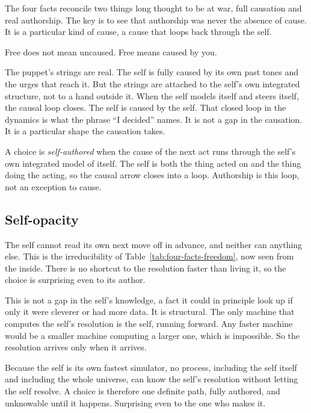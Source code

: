 The four facts reconcile two things long thought to be at war, full causation and real authorship. The key is to see that authorship was never the absence of cause. It is a particular kind of cause, a cause that loops back through the self.

\begin{principle}
Free does not mean uncaused. Free means caused by you.
\end{principle}

The puppet's strings are real. The self is fully caused by its own past tones and the urges that reach it. But the strings are attached to the self's own integrated structure, not to a hand outside it. When the self models itself and steers itself, the causal loop closes. The self is caused by the self. That closed loop in the dynamics is what the phrase ``I decided'' names. It is not a gap in the causation. It is a particular shape the causation takes.

\begin{definition}
A choice is \emph{self-authored} when the cause of the next act runs through the self's own integrated model of itself. The self is both the thing acted on and the thing doing the acting, so the causal arrow closes into a loop. Authorship is this loop, not an exception to cause.
\end{definition}

\subsection{Self-opacity}

The self cannot read its own next move off in advance, and neither can anything else. This is the irreducibility of Table~\ref{tab:four-facts-freedom}, now seen from the inside. There is no shortcut to the resolution faster than living it, so the choice is surprising even to its author.

This is not a gap in the self's knowledge, a fact it could in principle look up if only it were cleverer or had more data. It is structural. The only machine that computes the self's resolution is the self, running forward. Any faster machine would be a smaller machine computing a larger one, which is impossible. So the resolution arrives only when it arrives.

\begin{result}
Because the self is its own fastest simulator, no process, including the self itself and including the whole universe, can know the self's resolution without letting the self resolve. A choice is therefore one definite path, fully authored, and unknowable until it happens. Surprising even to the one who makes it.
\end{result}

